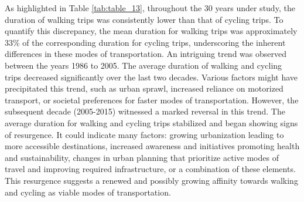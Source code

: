 \documentclass[12pt,twoside]{reedthesis}
\begin{document}
As highlighted in Table \ref{tab:table_13}, throughout the 30 years under study, the duration of walking trips was consistently lower than that of cycling trips. To quantify this discrepancy, the mean duration for walking trips was approximately 33\% of the corresponding duration for cycling trips, underscoring the inherent differences in these modes of transportation. An intriguing trend was observed between the years 1986 to 2005. The average duration of walking and cycling trips decreased significantly over the last two decades. Various factors might have precipitated this trend, such as urban sprawl, increased reliance on motorized transport, or societal preferences for faster modes of transportation. However, the subsequent decade (2005-2015) witnessed a marked reversal in this trend. The average duration for walking and cycling trips stabilized and began showing signs of resurgence. It could indicate many factors: growing urbanization leading to more accessible destinations, increased awareness and initiatives promoting health and sustainability, changes in urban planning that prioritize active modes of travel and improving required infrastructure, or a combination of these elements. This resurgence suggests a renewed and possibly growing affinity towards walking and cycling as viable modes of transportation.
\end{document}
